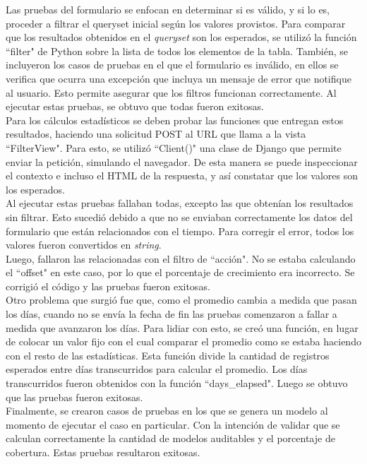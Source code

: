 Las pruebas del formulario se enfocan en determinar si es válido, y si lo es, proceder a filtrar el queryset inicial según los valores provistos. Para comparar que los resultados obtenidos en el \textit{queryset} son los esperados, se utilizó la función “filter" de Python sobre la lista de todos los elementos de la tabla. También, se incluyeron los casos de pruebas en el que el formulario es inválido, en ellos se verifica que ocurra una excepción que incluya un mensaje de error que notifique al usuario. Esto permite asegurar que los filtros funcionan correctamente. Al ejecutar estas pruebas, se obtuvo que todas fueron exitosas.\\

Para los cálculos estadísticos se deben probar las funciones que entregan estos resultados, haciendo una solicitud POST al URL que llama a la vista “FilterView". Para esto, se utilizó “Client()" una clase de Django que permite enviar la petición, simulando el navegador. De esta manera se puede inspeccionar el contexto e incluso el HTML de la respuesta, y así constatar que los valores son los esperados. \\

Al ejecutar estas pruebas fallaban todas, excepto las que obtenían los resultados sin filtrar. Esto sucedió debido a que no se enviaban correctamente los datos del formulario que están relacionados con el tiempo. Para corregir el error, todos los valores fueron convertidos en \textit{string}. \\

Luego, fallaron las relacionadas con el filtro de “acción". No se estaba calculando el “offset" en este caso, por lo que el porcentaje de crecimiento era incorrecto. Se corrigió el código y las pruebas fueron exitosas.\\

Otro problema que surgió fue que, como el promedio cambia a medida que pasan los días, cuando no se envía la fecha de fin las pruebas comenzaron a fallar a medida que avanzaron los días. Para lidiar con esto, se creó una función, en lugar de colocar un valor fijo con el cual comparar el promedio como se estaba haciendo con el resto de las estadísticas. Esta función divide la cantidad de registros esperados entre días transcurridos para calcular el promedio. Los días transcurridos fueron obtenidos con la función “days\_elapsed". Luego se obtuvo que las pruebas fueron exitosas.\\

Finalmente, se crearon casos de pruebas en los que se genera un modelo al momento de ejecutar el caso en particular. Con la intención de validar que se calculan correctamente la cantidad de modelos auditables y el porcentaje de cobertura. Estas pruebas resultaron exitosas.


